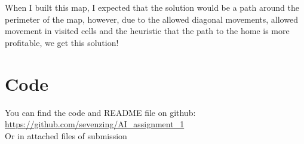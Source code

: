 \documentclass{article}
\begin{document}
When I built this map, I expected that the solution would be a path around the perimeter of the map, however, due to the allowed diagonal movements, allowed movement in visited cells and the heuristic that the path to the home is more profitable, we get this solution!

\section{Code}

You can find the code and README file on github: \url{https://github.com/sevenzing/AI_assignment_1}
\\
Or in attached files of submission 
\end{document}
